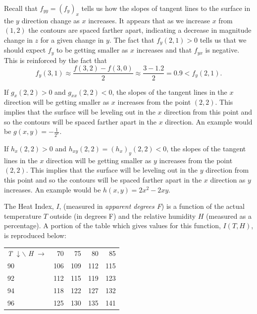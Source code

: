 \begin{exercises}
\begin{exerciseSolution}
\item Recall that $f_{yy} = (f_y)_x$ tells us how the slopes of tangent lines to the surface in the $y$ direction change as $x$ increases. It appears that as we increase $x$ from $(1,2)$ the contours are spaced farther apart, indicating a decrease in magnitude change in $z$ for a given change in $y$. The fact that $f_y(2,1) > 0$ tells us that we should expect $f_{y}$ to be getting smaller as $x$ increases and that $f_{yx}$ is negative. This is reinforced by the fact that 
\[f_y(3,1) \approx \frac{f(3,2)-f(3,0)}{2} \approx \frac{3-1.2}{2} = 0.9 < f_y(2,1).\] 
\item If $g_x(2,2)> 0$ and $g_{xx}(2,2) < 0$, the slopes of the tangent lines in the $x$ direction will be getting smaller as $x$ increases from the point $(2,2)$.  This implies that the surface will be leveling out in the $x$ direction from this point and so the contours will be spaced farther apart in the $x$ direction. An example would be $g(x,y) = -\frac{1}{2^x}$. 
\item If $h_x(2,2)> 0$ and $h_{xy}(2,2) = (h_x)_y(2,2) < 0$, the slopes of the tangent lines in the $x$ direction will be getting smaller as $y$ increases from the point $(2,2)$. This implies that the surface will be leveling out in the $y$ direction from this point and so the contours will be spaced farther apart in the $x$ direction as $y$ increases. An example would be $h(x,y) = 2x^2-2xy$.  

\ea
\end{exerciseSolution}



\item \label{Ez:10.3.1}   The Heat Index, $I$, (measured in \emph{apparent degrees F}) is a function of the actual temperature $T$ outside (in degrees F) and the relative humidity $H$ (measured as a percentage).  A portion of the table which gives values for this function, $I(T,H)$, is reproduced below:
\begin{center}
\begin{tabular}{|l||r|r|r|r|} \hline
\emph{T} $\downarrow \backslash$ \emph{H} $\rightarrow$ & 70 &	75 & 80 &	85  \\ \hhline{|=|=|=|=|=|}
90 & 106 & 109 & 112 & 115  \\ \hline
92 & 112 & 115 & 119 & 123  \\ \hline
94 & 118 & 122 & 127 & 132  \\ \hline
96 & 125 & 130 & 135 & 141  \\ \hline
\end{tabular}
\end{center}


\end{exercises}
